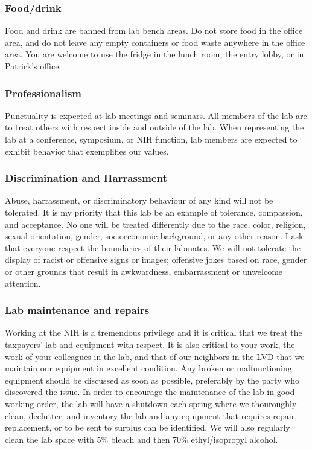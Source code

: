 \documentclass[10pt, letterpaper, twocolumn]{article} %
\begin{document}
\subsubsection{Food/drink} Food and drink are banned from lab bench areas. Do not store food in the office area, and do not leave any empty containers or food waste anywhere in the office area. You are welcome to use the fridge in the lunch room, the entry lobby, or in Patrick's office.

\subsubsection{Professionalism}
Punctuality is expected at lab meetings and seminars. All members of the lab are to treat others with respect inside and outside of the lab. When representing the lab at a conference, symposium, or NIH function, lab members are expected to exhibit behavior that exemplifies our values.

\subsubsection{Discrimination and Harrassment}
Abuse, harrassment, or discriminatory behaviour of any kind will not be tolerated. It is my priority that this lab be an example of tolerance, compassion, and acceptance. No one will be treated differently due to the race, color, religion, sexual orientation, gender, socioeconomic background, or any other reason. I ask that everyone respect the boundaries of their labmates. We will not tolerate the display of racist or offensive signs or images; offensive jokes based on race, gender or other grounds that result in awkwardness, embarrassment or unwelcome attention.

\subsubsection{Lab maintenance and repairs}
Working at the NIH is a tremendous privilege and it is critical that we treat the taxpayers' lab and equipment with respect. It is also critical to your work, the work of your colleagues in the lab, and that of our neighbors in the LVD that we maintain our equipment in excellent condition. Any broken or malfunctioning equipment should be discussed as soon as possible, preferably by the party who discovered the issue.
In order to encourage the maintenance of the lab in good working order, the lab will have a shutdown each spring where we thouroughly clean, declutter, and inventory the lab and any equipment that requires repair, replacement, or to be sent to surplus can be identified. We will also regularly clean the lab space with 5\% bleach and then 70\% ethyl/isopropyl alcohol.
\end{document}

